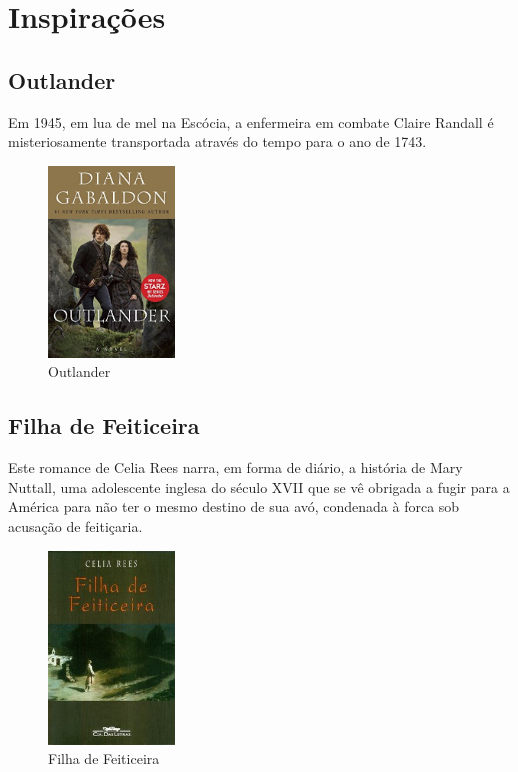 \section{Inspirações}


\subsection{Outlander}

Em 1945, em lua de mel na Escócia, a enfermeira em combate Claire Randall é
misteriosamente transportada através do tempo para o ano de 1743.

\begin{figure}[!htb] \caption{\label{Outlander}Outlander} \begin{center}
\includegraphics[width=0.3\textwidth]{imagens/outlander.jpg} \end{center}
 \end{figure}

\subsection{Filha de Feiticeira}

Este romance de Celia Rees narra, em forma de diário, a história de Mary
Nuttall, uma adolescente inglesa do século XVII que se vê obrigada a fugir para
a América para não ter o mesmo destino de sua avó, condenada à forca sob
acusação de feitiçaria.

\clearpage

\begin{figure}[!htb] \caption{\label{filha_feiticeira}Filha de Feiticeira}
    \begin{center}
    \includegraphics[width=0.3\textwidth]{imagens/feiticeira.jpeg} \end{center}
 \end{figure}




